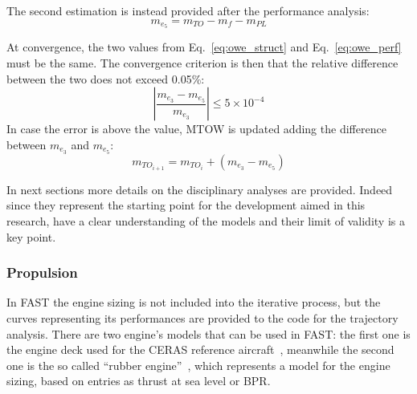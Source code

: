 The second estimation is instead provided after the performance analysis:
\begin{equation}
\label{eq:owe_perf}
m_{e_{5}} = m_{TO} - m_f - m_{PL} 
\end{equation}

At convergence, the two values from Eq.~\eqref{eq:owe_struct} and Eq.~\eqref{eq:owe_perf} must be the same. 
The convergence criterion is then that the relative difference between the two does not exceed 0.05\%:
\begin{equation}
\label{eq:fast_conv_crit}
\left\lvert \frac{m_{e_{3}} - m_{e_{5}}}{m_{e_{3}}}\right\rvert \leq 5\times10^{-4}
\end{equation}
In case the error is above the value, MTOW is updated adding the difference between $m_{e_{3}}$ and $m_{e_{5}}$:
\begin{equation}
\label{eq:mtow_new}
m_{{TO}_{i+1}} = m_{{TO}_{i}} + \left(m_{e_{3}} - m_{e_{5}}\right)
\end{equation}

In next sections more details on the disciplinary analyses are provided. 
Indeed since they represent the starting point for the development aimed in this research, have a clear understanding of the models and their limit of validity is a key point.

\subsubsection{Propulsion}
\label{subsubsec:chap2_fast_propulsion}

In FAST the engine sizing is not included into the iterative process, but the curves representing its performances are provided to the code for the trajectory analysis. 
There are two engine's models that can be used in FAST: the first one is the engine deck used for the CERAS reference aircraft~\cite{bib:ceras}, meanwhile the second one is the so called ``rubber engine''~\cite{bib:roux}, which represents a model for the engine sizing, based on entries as thrust at sea level or BPR.

